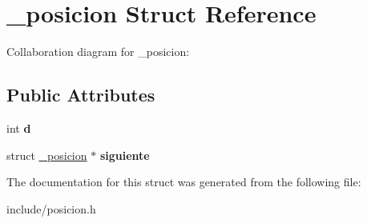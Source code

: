 \hypertarget{struct__posicion}{}\section{\+\_\+posicion Struct Reference}
\label{struct__posicion}


Collaboration diagram for \+\_\+posicion\+:
\subsection*{Public Attributes}
\begin{DoxyCompactItemize}
\item 
\mbox{\label{struct__posicion_a775334a72a2c82e09b6cf29c230ebd35}} 
int {\bfseries d}
\item 
\mbox{\label{struct__posicion_acfb9fe01e8bfe1343b349effb7a56232}} 
struct \hyperlink{struct__posicion}{\+\_\+posicion} $\ast$ {\bfseries siguiente}
\end{DoxyCompactItemize}


The documentation for this struct was generated from the following file\+:\begin{DoxyCompactItemize}
\item 
include/posicion.\+h\end{DoxyCompactItemize}
